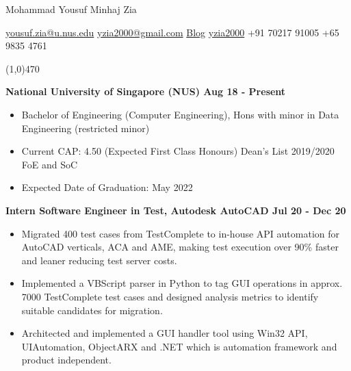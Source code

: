 \documentclass[11pts]{article}
\begin{document}
\centerline{{\Huge \sc  Mohammad Yousuf Minhaj Zia}}
\centerline{\href{mailto:yousuf.zia@u.nus.edu}{yousuf.zia@u.nus.edu} \textbar
\hspace{1pt} \href{mailto:yzia2000@gmail.com}{yzia2000@gmail.com} \textbar
\hspace{1pt} \href{https://yzia2000.github.io/blog}{Blog} \textbar
\hspace{1pt} \faGithub \hspace{1pt}
\href{https://github.com/yzia2000}{yzia2000} \textbar
\hspace{1pt} \href{https://www.linkedin.com/in/mohammad-yousuf-minhaj-zia-ab555396}{\faLinkedin} \textbar
\hspace{1pt} +91 70217 91005 \textbar
\hspace{1pt} +65 9835 4761 
}
\noindent
\line(1,0){470}\\


\smallskip

\noindent \centerline{\large \bf National University of Singapore (NUS) \hfill Aug 18 - Present}
\begin{itemize}
    \item Bachelor of Engineering (Computer Engineering), Hons with minor in Data Engineering (restricted minor)
    \item Current CAP: 4.50 (Expected First Class Honours) Dean's List 2019/2020 FoE and SoC
    \item Expected Date of Graduation: May 2022
\end{itemize}
\smallskip

\smallskip

\noindent \centerline{\large \bf Intern Software Engineer in Test, Autodesk AutoCAD \hfill Jul 20 - Dec 20}
\begin{itemize}
    \item Migrated 400 test cases from TestComplete to in-house API automation for AutoCAD verticals, ACA and AME, making test execution over 90\% faster and leaner reducing test server costs.
    \item Implemented a VBScript parser in Python to tag GUI operations in approx. 7000 TestComplete test cases and designed analysis metrics to identify suitable candidates for migration.
    \item Architected and implemented a GUI handler tool using Win32 API, UIAutomation, ObjectARX and .NET which is automation framework and product independent.
\end{itemize}
\smallskip
\end{document}
